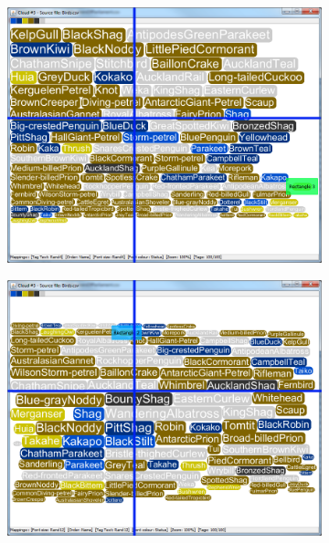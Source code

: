 \begin{figure}[!htb]
\begin{subfigure}{.5\textwidth}
  \includegraphics[scale=0.25]{Experiment1/Trial2/C1S1L2.png}
\end{subfigure}%
\begin{subfigure}{.5\textwidth}
  \centering
 \includegraphics[scale=0.25]{Experiment1/Trial2/C1S1L1.png}
\end{subfigure}
\begin{subfigure}{.5\textwidth}
  \centering

\end{subfigure}
\end{figure}

